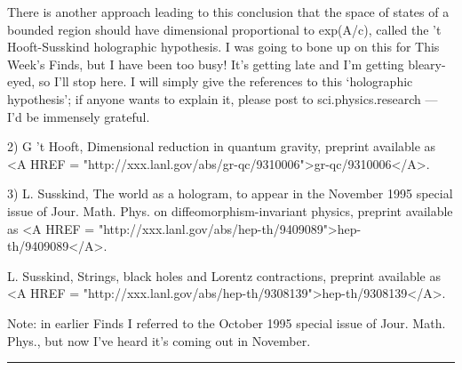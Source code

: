 There is another approach leading to this conclusion that the space
of states of a bounded region should have dimensional proportional to 
exp(A/c), called the 't Hooft-Susskind holographic hypothesis.  I was
going to bone up on this for This Week's Finds, but I have been too
busy!  It's getting late and I'm getting bleary-eyed, so I'll stop
here.  I will simply give the references to this `holographic hypothesis'; 
if anyone wants to explain it, please post to sci.physics.research --- 
I'd be immensely grateful.

2) G 't Hooft, Dimensional reduction in quantum gravity, preprint
available as <A HREF = "http://xxx.lanl.gov/abs/gr-qc/9310006">gr-qc/9310006</A>.

3) L. Susskind, The world as a hologram, to appear in the November
1995 special issue of Jour. Math. Phys. on diffeomorphism-invariant physics, 
preprint available as <A HREF = "http://xxx.lanl.gov/abs/hep-th/9409089">hep-th/9409089</A>.

L. Susskind, Strings, black holes and Lorentz contractions, preprint
available as <A HREF = "http://xxx.lanl.gov/abs/hep-th/9308139">hep-th/9308139</A>.

Note: in earlier Finds I referred to the October 1995 special issue of 
Jour. Math. Phys., but now I've heard it's coming out in November.
\par\noindent\rule{\textwidth}{0.4pt}

